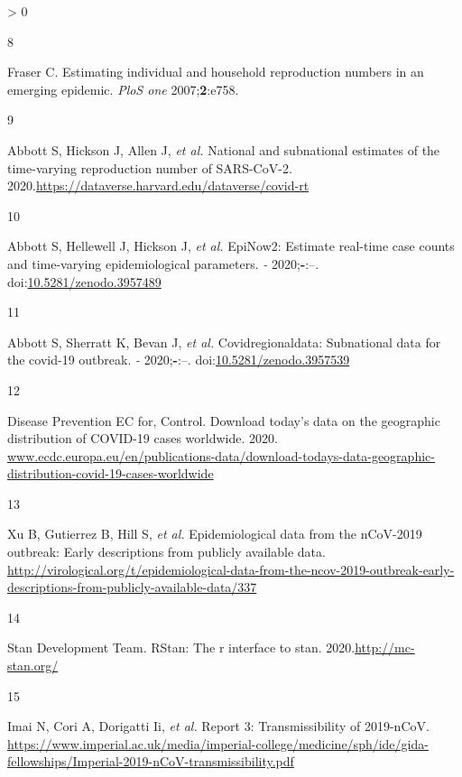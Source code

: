 \documentclass[
]{article}
\newlength{\cslhangindent}
\newlength{\csllabelwidth}
\newenvironment{CSLReferences}[2] %
 {%
  \setlength{\parindent}{0pt}
  \ifodd #1 \everypar{\setlength{\hangindent}{\cslhangindent}}\ignorespaces\fi
  \ifnum #2 > 0
  \setlength{\parskip}{#2\baselineskip}
  \fi
 }%
 {}
\newcommand{\CSLLeftMargin}[1]{\parbox[t]{\csllabelwidth}{#1}}
\newcommand{\CSLRightInline}[1]{\parbox[t]{\linewidth - \csllabelwidth}{#1}\break}
\begin{document}
\begin{CSLReferences}{0}{0}
\leavevmode\hypertarget{ref-Fraser:2007hf}{}%
\CSLLeftMargin{8 }
\CSLRightInline{Fraser C. Estimating individual and household
reproduction numbers in an emerging epidemic. \emph{PloS one}
2007;\textbf{2}:e758.}

\leavevmode\hypertarget{ref-dataverse}{}%
\CSLLeftMargin{9 }
\CSLRightInline{Abbott S, Hickson J, Allen J, \emph{et al.} National and
subnational estimates of the time-varying reproduction number of
SARS-CoV-2. 2020.\url{https://dataverse.harvard.edu/dataverse/covid-rt}}

\leavevmode\hypertarget{ref-epinow2}{}%
\CSLLeftMargin{10 }
\CSLRightInline{Abbott S, Hellewell J, Hickson J, \emph{et al.} EpiNow2:
Estimate real-time case counts and time-varying epidemiological
parameters. \emph{-} 2020;\textbf{-}:--.
doi:\href{https://doi.org/10.5281/zenodo.3957489}{10.5281/zenodo.3957489}}

\leavevmode\hypertarget{ref-covidregionaldata}{}%
\CSLLeftMargin{11 }
\CSLRightInline{Abbott S, Sherratt K, Bevan J, \emph{et al.}
Covidregionaldata: Subnational data for the covid-19 outbreak. \emph{-}
2020;\textbf{-}:--.
doi:\href{https://doi.org/10.5281/zenodo.3957539}{10.5281/zenodo.3957539}}

\leavevmode\hypertarget{ref-ecdc_data}{}%
\CSLLeftMargin{12 }
\CSLRightInline{Disease Prevention EC for, Control. Download today's
data on the geographic distribution of COVID-19 cases worldwide. 2020.
\href{https://www.ecdc.europa.eu/en/publications-data/download-todays-data-geographic-distribution-covid-19-cases-worldwide}{www.ecdc.europa.eu/en/publications-data/download-todays-data-geographic-distribution-covid-19-cases-worldwide}}

\leavevmode\hypertarget{ref-kraemer2020epidemiological}{}%
\CSLLeftMargin{13 }
\CSLRightInline{Xu B, Gutierrez B, Hill S, \emph{et al.} Epidemiological
data from the nCoV-2019 outbreak: Early descriptions from publicly
available data.
\url{http://virological.org/t/epidemiological-data-from-the-ncov-2019-outbreak-early-descriptions-from-publicly-available-data/337}}

\leavevmode\hypertarget{ref-rstan}{}%
\CSLLeftMargin{14 }
\CSLRightInline{Stan Development Team. RStan: The r interface to stan.
2020.\url{http://mc-stan.org/}}

\leavevmode\hypertarget{ref-Imai:webreport3}{}%
\CSLLeftMargin{15 }
\CSLRightInline{Imai N, Cori A, Dorigatti Ii, \emph{et al.} Report 3:
Transmissibility of 2019-nCoV.
\url{https://www.imperial.ac.uk/media/imperial-college/medicine/sph/ide/gida-fellowships/Imperial-2019-nCoV-transmissibility.pdf}}


\end{CSLReferences}
\end{document}
